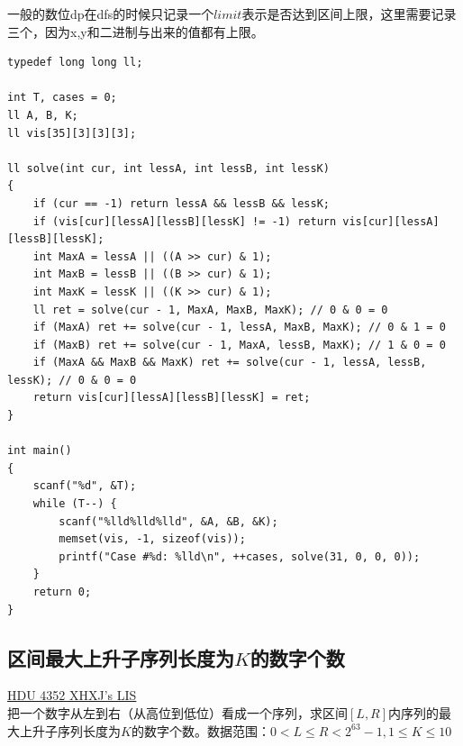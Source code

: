 一般的数位dp在dfs的时候只记录一个$limit$表示是否达到区间上限，这里需要记录三个，因为x,y和二进制与出来的值都有上限。
\begin{lstlisting}
typedef long long ll;

int T, cases = 0;
ll A, B, K;
ll vis[35][3][3][3];

ll solve(int cur, int lessA, int lessB, int lessK)
{
	if (cur == -1) return lessA && lessB && lessK;
	if (vis[cur][lessA][lessB][lessK] != -1) return vis[cur][lessA][lessB][lessK];
	int MaxA = lessA || ((A >> cur) & 1);
	int MaxB = lessB || ((B >> cur) & 1);
	int MaxK = lessK || ((K >> cur) & 1);
	ll ret = solve(cur - 1, MaxA, MaxB, MaxK); // 0 & 0 = 0
	if (MaxA) ret += solve(cur - 1, lessA, MaxB, MaxK); // 0 & 1 = 0
	if (MaxB) ret += solve(cur - 1, MaxA, lessB, MaxK); // 1 & 0 = 0
	if (MaxA && MaxB && MaxK) ret += solve(cur - 1, lessA, lessB, lessK); // 0 & 0 = 0
	return vis[cur][lessA][lessB][lessK] = ret;
}

int main()
{
	scanf("%d", &T);
	while (T--) {
		scanf("%lld%lld%lld", &A, &B, &K);
		memset(vis, -1, sizeof(vis));
		printf("Case #%d: %lld\n", ++cases, solve(31, 0, 0, 0));
	}
	return 0;
}
\end{lstlisting}

\subsection{区间最大上升子序列长度为$K$的数字个数}

\underline {HDU 4352 XHXJ's LIS} \\

把一个数字从左到右（从高位到低位）看成一个序列，求区间$[L,R]$内序列的最大上升子序列长度为$K$的数字个数。数据范围：$0< L\leq R < 2^{63} - 1,1\leq K\leq 10$  \\

